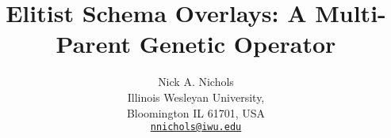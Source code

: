 \documentclass{article}
\makeatletter
\def \papertitle {Elitist Schema Overlays: A Multi-Parent Genetic Operator}
\def \paperauthors {Nick A. Nichols}
\def \paperinstitute {\small Illinois Wesleyan University, \\ \small Bloomington IL 61701, USA}
\def \paperemails {\small\href{mailto:nnichols@iwu.edu}{\nolinkurl{nnichols@iwu.edu}}}
\makeatother
\begin{document}
\title{\papertitle}
\author{\paperauthors \\ \paperinstitute \\ \paperemails}

\maketitle


\begin{abstract}

\end{abstract}

\end{document}
